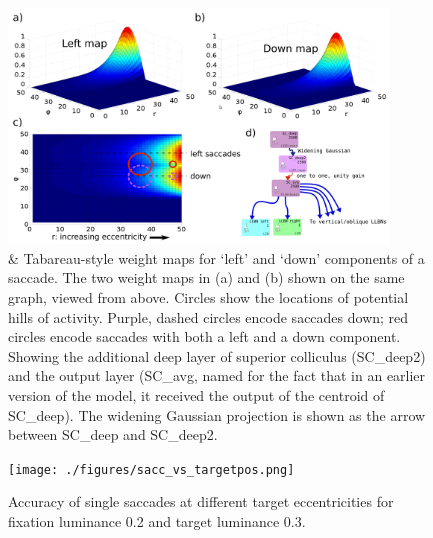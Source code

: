 \documentclass{frontiersSCNS}
\begin{document}
\begin{figure}[!ht]
\begin{center}
\includegraphics[width=0.9\textwidth]{./figures/scdeep_plus.png}
\end{center}
\caption{  \&  Tabareau-style weight maps for `left' and `down' components
of a saccade.  The two weight maps in (a) and (b) shown on the same
graph, viewed from above. Circles show the locations of potential
hills of activity. Purple, dashed circles encode saccades down;
red circles encode saccades with both a left and a down component. 
Showing the additional deep layer of superior colliculus (SC\_deep2)
and the output layer (SC\_avg, named for the fact that in an earlier
version of the model, it received the output of the centroid of
SC\_deep).  The widening Gaussian projection is shown as the arrow
between SC\_deep and SC\_deep2.}
\label{fig:scdeep}
\end{figure}

\begin{figure}[!ht]
\begin{center}
\texttt{[image: ./figures/sacc\_vs\_targetpos.png]}
\end{center}
\caption{ Accuracy of single saccades at different target eccentricities for fixation luminance
0.2 and target luminance 0.3.}
\label{fig:saccvstarg}
\end{figure}
\end{document}
